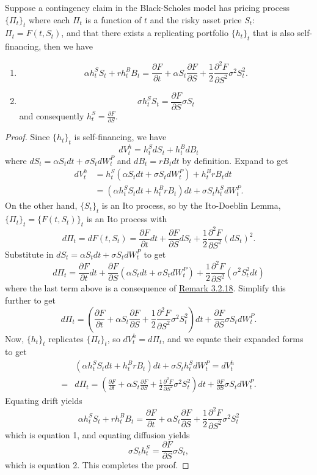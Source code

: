 \documentclass[11pt,fleqn]{book} %
\begin{document}
\begin{lemma} \label{lemma:413}
Suppose a contingency claim in the Black-Scholes model has pricing process \(\{\Pi_t\}_t\) where each \(\Pi_t\) is a function of \(t\) and the risky asset price \(S_t\): \(\Pi_t = F(t, S_t)\), and that there exists a replicating portfolio \(\{h_t\}_t\) that is also self-financing, then we have
\begin{enumerate}
    \item 
    \[
    \alpha h_t^SS_t + rh_t^B B_t = \frac{\partial F}{\partial t} + \alpha S_t\frac{\partial F}{\partial S} + \frac12\frac{\partial^2F}{\partial S^2}\sigma^2S_t^2.
    \]
    \item
    \[
    \sigma h_t^SS_t = \frac{\partial F}{\partial S}\sigma S_t
    \]
    and consequently \(h_t^S = \frac{\partial F}{\partial S}\).
\end{enumerate}
\end{lemma}
\begin{proof}
Since \(\{h_t\}_t\) is self-financing, we have
\[
dV_t^h = h_t^SdS_t + h_t^BdB_t
\]
where \(dS_t = \alpha S_tdt + \sigma S_tdW_t^P\) and \(dB_t = rB_tdt\) by definition. Expand to get
\[
\begin{aligned}
dV_t^h &= h_t^S(\alpha S_tdt + \sigma S_t dW_t^P) + h_t^BrB_tdt \\
&= (\alpha h_t^SS_tdt + h_t^BrB_t)dt + \sigma S_th_t^SdW_t^P.
\end{aligned}
\]
\indent On the other hand, \(\{S_t\}_t\) is an Ito process, so by the Ito-Doeblin Lemma, \(\{\Pi_t\}_t = \{F(t, S_t)\}_t\) is an Ito process with
\[
d\Pi_t = dF(t, S_t) = \frac{\partial F}{\partial t}dt + \frac{\partial F}{\partial S}dS_t + \frac12\frac{\partial^2 F}{\partial S^2}(dS_t)^2.
\]
\indent Substitute in \(dS_t = \alpha S_tdt + \sigma S_tdW_t^P\) to get
\[
d\Pi_t = \frac{\partial F}{\partial t}dt + \frac{\partial F}{\partial S}(\alpha S_tdt + \sigma S_tdW_t^P) + \frac12\frac{\partial^2F}{\partial S^2}(\sigma^2S_t^2dt)
\]
where the last term above is a consequence of \hyperref[rmk:3218]{Remark 3.2.18}. Simplify this further to get
\[
d\Pi_t = \left(\frac{\partial F}{\partial t} + \alpha S_t\frac{\partial F}{\partial S} + \frac12\frac{\partial^2F}{\partial S^2}\sigma^2S_t^2\right)dt + \frac{\partial F}{\partial S}\sigma S_tdW_t^P.
\]
\indent Now, \(\{h_t\}_t\) replicates \(\{\Pi_t\}_t\), so \(dV_t^h = d\Pi_t\), and we equate their expanded forms to get
\[
\begin{aligned}
&(\alpha h_t^SS_tdt + h_t^BrB_t)dt + \sigma S_th_t^SdW_t^P = dV_t^h \\
= &d\Pi_t = \left(\frac{\partial F}{\partial t} + \alpha S_t\frac{\partial F}{\partial S} + \frac12\frac{\partial^2F}{\partial S^2}\sigma^2S_t^2\right)dt + \frac{\partial F}{\partial S}\sigma S_tdW_t^P.
\end{aligned}
\]
\indent Equating drift yields
\[
\alpha h_t^SS_t + rh_t^BB_t = \frac{\partial F}{\partial t} + \alpha S_t\frac{\partial F}{\partial S} + \frac12\frac{\partial^2F}{\partial S^2}\sigma^2S_t^2
\]
which is equation 1, and equating diffusion yields
\[
\sigma S_th_t^S = \frac{\partial F}{\partial S}\sigma S_t,
\]
which is equation 2. This completes the proof.
\end{proof}
\end{document}
